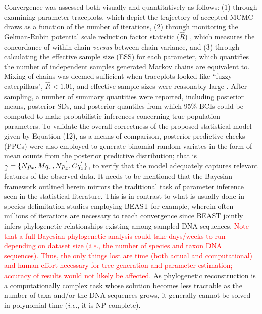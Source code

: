 \documentclass[12pt]{article}
\begin{document}
Convergence was assessed both visually and quantitatively as follows: (1) through \\ examining parameter traceplots, which depict the trajectory of accepted MCMC draws as a function of the number of iterations, (2) through monitoring the Gelman-Rubin potential scale reduction factor statistic   ($\hat{R}$)  \citep{gelman1992iterative, vehtari2017rank}, which measures the concordance of within-chain \textit{versus} between-chain variance, and (3) through calculating the effective sample size (ESS) for each parameter, which quantifies the number of independent samples generated Markov chains are equivalent to. Mixing of chains was deemed sufficient when traceplots looked like ``fuzzy caterpillars", $\hat{R} < 1.01$, and effective sample sizes were reasonably large \citep{gelman2020bayesian}.
After sampling, a number of summary quantities were reported, including posterior means, posterior SDs, and posterior quantiles from which 95\% BCIs could be computed to make probabilistic inferences concerning true population parameters. To validate the overall correctness of the proposed statistical model given by Equation (12), as a means of comparison, posterior predictive checks (PPCs) were also employed to generate binomial random variates in the form of mean counts from the posterior predictive distribution; that is $\underaccent{\bar}{\gamma} = \{Np_x, Mq_x, Np^{'}_x, Cq^{'}_x\}$, to verify that the model adequately captures relevant features of the observed data. It needs to be mentioned that the Bayesian framework outlined herein mirrors the traditional task of parameter inference seen in the statistical literature. This is in contrast to what is usually done in species delimitation studies employing BEAST for example, wherein often millions of iterations are necessary to reach convergence since BEAST jointly infers phylogenetic relationships existing among sampled DNA sequences. \textcolor{red}{Note that a full Bayesian phylogenetic analysis could take days/weeks to run depending on dataset size (\textit{i.e.}, the number of species and taxon DNA sequences). Thus, the only things lost are time (both actual and computational) and human effort necessary for tree generation and parameter estimation; accuracy of results would not likely be affected.} As phylogenetic reconstruction is a computationally complex task whose solution becomes less tractable as the number of taxa and/or the DNA sequences grows, it generally cannot be solved in polynomial time (\textit{i.e.}, it is NP-complete).
\end{document}
